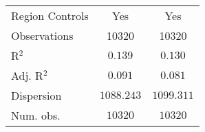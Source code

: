 \begin{center}
\begin{tiny}
\begin{longtable}{l@{} c@{} c@{}}
\hline
Region Controls                                                             & Yes              & Yes              \\
Observations                                                                & 10320            & 10320            \\
R$^2$                                                                       & $0.139$          & $0.130$          \\
Adj. R$^2$                                                                  & $0.091$          & $0.081$          \\
Dispersion                                                                  & $1088.243$       & $1099.311$       \\
Num. obs.                                                                   & $10320$          & $10320$          \\
\end{longtable}
\end{tiny}
\end{center}
